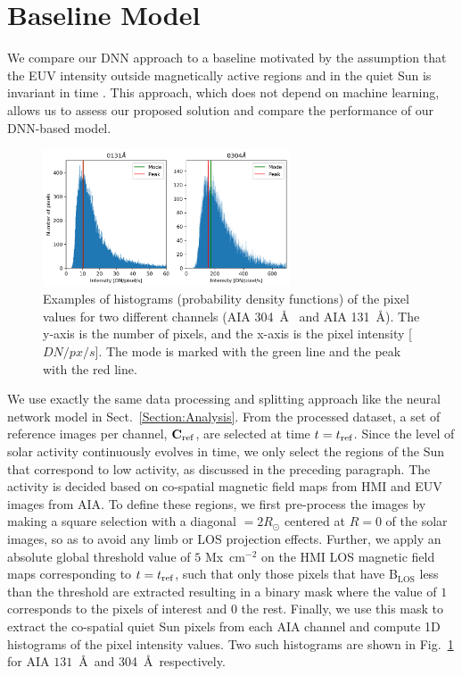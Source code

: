\documentclass[twocolumn,usenames,dvipsnames]{aastex63}
\begin{document}
\section{Baseline Model}
\label{section:baseline}

We compare our DNN approach to a baseline motivated by the assumption that the EUV intensity outside magnetically active regions and in the quiet Sun is invariant in time 
\citep[a similar approach is also considered for the in-flight calibration of some UV instruments, e.g.][]{Schule1998}. This approach, which does not depend on  machine learning, allows us to assess our proposed solution and compare the performance of our DNN-based model. 

\begin{figure}[h]
    \centering
        \includegraphics[height=1.6in]{fig_baseline_histogram.pdf}
        \caption{Examples of histograms (probability density functions) of the pixel values for two different channels (AIA 304~\AA~ and AIA 131~\AA). The y-axis is the number of pixels, and the x-axis is the pixel intensity [$DN/px/s$]. The mode is marked with the green line and the peak with the red line.}
        \label{fig:baseline_histogram}
\end{figure}

We use exactly the same data processing and splitting approach like the neural network model in Sect.~\ref{Section:Analysis}. From the processed dataset, a set of reference images per channel, $\mathbf{C_{\rm ref}}$, are selected at time $t=t_{\rm ref}$. Since the level of solar activity continuously evolves in time, we only select the regions of the Sun that correspond to low activity, as discussed in the preceding paragraph. The activity is decided based on co-spatial magnetic field maps from HMI and EUV images from AIA. To define these regions, we first pre-process the images by making a square selection with a diagonal $= 2R_\odot$ centered at $R=0$ of the solar images, so as to avoid any limb or LOS projection effects. Further, we apply an absolute global threshold value of  $5$ Mx~cm$^{-2}$ on the HMI LOS magnetic field maps corresponding to $t=t_{\rm ref}$, such that only those pixels that have B$_{\mathrm{LOS}}$ less than the threshold are extracted resulting in a binary mask where the value of $1$ corresponds to the pixels of interest and $0$ the rest. Finally, we use this mask to extract the co-spatial quiet Sun pixels from each AIA channel and compute 1D histograms of the pixel intensity values. Two such histograms are shown in Fig.~\ref{fig:baseline_histogram} for AIA $131$~\AA\ and 304~\AA\, respectively.
\end{document}
